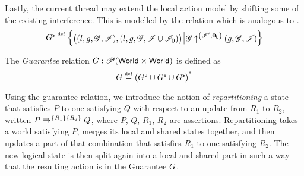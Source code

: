 
Lastly, the current thread may extend the local action model by
shifting some of the existing interference. This is modelled by the
\shiftG relation which is analogous to \shiftR.
\[
\shiftG \eqdef
\left\{
\begin{array}{@{} l @{\hspace*{2pt}} | @{\hspace*{2pt}} r @{}}
  \left(
  \begin{array}{@{} l @{}}
    (l, g, \gmod, \lmod),
    \left( l, g, \gmod, \lmod \cup \lmod_0  \right)
  \end{array}
  \right)
  &
  \expandsAM{\gmod}{\lmod'}{\unitL}{g}{\gmod}{\lmod}
\end{array}
\right\}
\]

\begin{definition}[Guarantee]
The \emph{Guarantee} relation $\guarantee: \powerset (\Worlds \times \Worlds)$ is defined as
\[
\guarantee \eqdef  \left( \updateG \cup \extendG \cup \shiftG \right)^{\text{*}}
\]
\end{definition}

Using the guarantee relation, we introduce the notion of
\emph{repartitioning} a state that satisfies $P$ to one satisfying $Q$
with respect to an update from $R_1$ to $R_2$, written
$\repartitions{P}{Q}{R_1}{R_2}$, where $P$, $Q$, $R_1$, $R_2$ are
assertions. Repartitioning takes a world satisfying $P$, merges its
local and shared states together, and then updates a part of that
combination that satisfies $R_1$ to one satisfying $R_2$. The new
logical state is then split again into a local and shared part in such
a way that the resulting action is in the Guarantee $\guarantee$.


